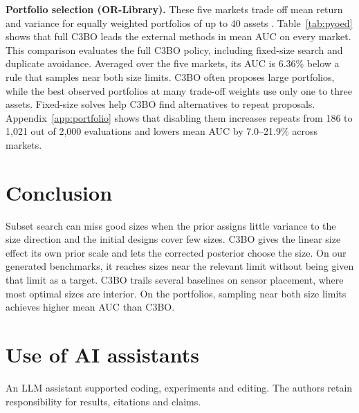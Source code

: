 \documentclass{article}
\newcommand{\revtext}[1]{{\color{blue}#1}}
\newenvironment{revisionchanges}{\begingroup\color{blue}}{\endgroup}
\theoremstyle{remark}\newtheorem{remark}[proposition]{Remark}
\begin{document}
\revtext{\textbf{Portfolio selection (OR-Library).} These five markets trade off mean return and variance for equally weighted portfolios of up to 40 assets \citep{beasley1990or,chang2000heuristics}. Table~\ref{tab:pyoed} shows that full C3BO leads the external methods in mean AUC on every market. This comparison evaluates the full C3BO policy, including fixed-size search and duplicate avoidance. Averaged over the five markets, its AUC is 6.36\% below a rule that samples near both size limits. C3BO often proposes large portfolios, while the best observed portfolios at many trade-off weights use only one to three assets. Fixed-size solves help C3BO find alternatives to repeat proposals. Appendix~\ref{app:portfolio} shows that disabling them increases repeats from 186 to 1,021 out of 2,000 evaluations and lowers mean AUC by 7.0--21.9\% across markets.}

\finishwrap

\section{Conclusion}\label{sec:conclusion}\label{sec:limits}

\revtext{Subset search can miss good sizes when the prior assigns little variance to the size direction and the initial designs cover few sizes. C3BO gives the linear size effect its own prior scale and lets the corrected posterior choose the size. On our generated benchmarks, it reaches sizes near the relevant limit without being given that limit as a target. C3BO trails several baselines on sensor placement, where most optimal sizes are interior. On the portfolios, sampling near both size limits achieves higher mean AUC than C3BO.}

\label{endmain}
\clearpage



\section*{Use of AI assistants}
\revtext{An LLM assistant supported coding, experiments and editing. The authors retain responsibility for results, citations and claims.}


\begin{revisionchanges}

\end{revisionchanges}
\end{document}
